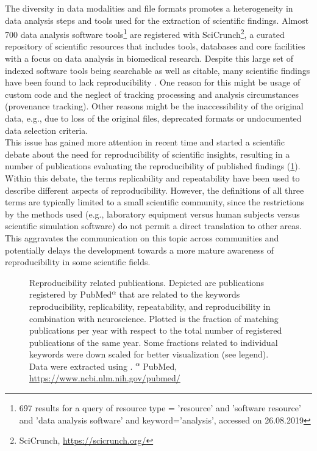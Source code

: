 The diversity in data modalities and file formats promotes a heterogeneity in data analysis steps and tools used for the extraction of scientific findings. Almost 700 data analysis software tools\footnote{697 results for a query of resource type = 'resource' and 'software resource' and 'data analysis software' and keyword='analysis', accessed on 26.08.2019} are registered with SciCrunch\footnote{SciCrunch, \url{https://scicrunch.org/}}, a curated repository of scientific resources that includes tools, databases and core facilities with a focus on data analysis in biomedical research. Despite this large set of indexed software tools being searchable as well as citable, many scientific findings have been found to lack reproducibility \citep{Ioannidis_2005,Ioannidis_2007,Baker_2016,Eisner_2018}. One reason for this might be usage of custom code and the neglect of tracking processing and analysis circumstances (provenance tracking). Other reasons might be the inaccessibility of the original data, e.g., due to loss of the original files, deprecated formats or undocumented data selection criteria.\\

This issue has gained more attention in recent time and started a scientific debate about the need for reproducibility of scientific insights, resulting in a number of publications evaluating the reproducibility of published findings (\cref{fig:intro_reproducibility}).
Within this debate, the terms replicability and repeatability \citep{Plesser_2018} have been used to describe different aspects of reproducibility. However, the definitions of all three terms are typically limited to a small scientific community, since the restrictions by the methods used (e.g., laboratory equipment versus human subjects versus scientific simulation software) do not permit a direct translation to other areas. This aggravates the communication on this topic across communities and potentially delays the development towards a more mature awareness of reproducibility in some scientific fields.\\


\begin{figure}[h!]
 \centering
 
 \caption[Reproducibility related publications]{Reproducibility related publications. Depicted  are publications registered by PubMed\textsuperscript{$\alpha$} that are related to the keywords reproducibility, replicability, repeatability, and reproducibility in combination with neuroscience. Plotted is the fraction of matching publications per year with respect to the total number of registered publications of the same year. Some fractions related to individual keywords were down scaled for better visualization (see legend). Data were extracted using \citet{Corlan_2004}. \small\textsuperscript{$\alpha$} PubMed, \url{https://www.ncbi.nlm.nih.gov/pubmed/}}
 \label{fig:intro_reproducibility}
\end{figure}

